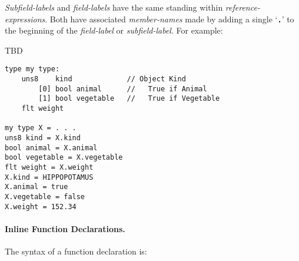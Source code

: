 \documentclass[12pt]{article}
\newcommand{\subsubsubsection}[1]{\paragraph[#1]{#1.}}
\newcommand{\TT}[1]{{\tt \bfseries #1}}
\newenvironment{indpar}[1][0.3in]%
	{\begin{list}{}%
		     {\setlength{\itemsep}{0in}%
		      \setlength{\topsep}{0in}%
		      \setlength{\parsep}{1ex}%
		      \setlength{\labelwidth}{#1}%
		      \setlength{\leftmargin}{#1}%
		      \addtolength{\leftmargin}{\labelsep}}%
	 \item}%
	{\end{list}}
\begin{document}
{\em Subfield-labels} and {\em field-labels} have the same standing within
{\em reference-expressions}.
Both have associated {\em member-names} made by adding a single
`\TT{.}' to the beginning of the {\em field-label} or {\em subfield-label}.
For example:

TBD

\begin{indpar}\begin{verbatim}
type my type:
    uns8    kind             // Object Kind
        [0] bool animal      //   True if Animal
        [1] bool vegetable   //   True if Vegetable
    flt weight

my type X = . . .
uns8 kind = X.kind
bool animal = X.animal
bool vegetable = X.vegetable
flt weight = X.weight
X.kind = HIPPOPOTAMUS
X.animal = true 
X.vegetable = false
X.weight = 152.34
\end{verbatim}\end{indpar}



\subsubsubsection{Inline Function Declarations}
\label{INLINE-FUNCTION-DECLARATIONS}

The syntax of a function declaration is:
\end{document}
